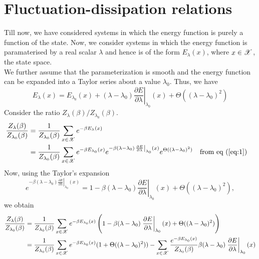\documentclass[letterpaper,english,12pt]{article}
\begin{document}
\section{Fluctuation-dissipation relations}
Till now, we have considered systems in which the energy function is purely a function of the state. Now, we consider systems in which the energy function is paramaterised by a real scalar $\lambda$ and hence is of the form $E_\lambda(x)$, where $x \in \mathscr{X}$, the state space.\\
We further assume that the parameterization is smooth and the energy function can be expanded into a Taylor series about a value $\lambda_0$. Thus, we have
\begin{equation}
E_\lambda(x) = E_{\lambda_0}(x) + (\lambda - \lambda_0)\left. \frac{\partial E}{\partial \lambda} \right|_{\lambda_0}(x) + \Theta((\lambda - \lambda_0)^2) \label{eq:1}
\end{equation}
Consider the ratio $Z_\lambda(\beta) / Z_{\lambda_0}(\beta)$.
\begin{align}
\frac{Z_\lambda(\beta)}{Z_{\lambda_0}(\beta)} &= \frac{1}{Z_{\lambda_0}(\beta)} \sum_{x \in \mathscr{X}} e^{-\beta E_{\lambda}(x)} \nonumber \\
	&= \frac{1}{Z_{\lambda_0}(\beta)} \sum_{x \in \mathscr{X}} e^{-\beta E_{\lambda_0}(x)} e^{-\beta (\lambda - \lambda_0)\left. \frac{\partial E}{\partial \lambda} \right|_{\lambda_0}(x)} e^{\Theta((\lambda - \lambda_0)^2)} && \text{from eq (\ref{eq:1})} \nonumber
\end{align}
Now, using the Taylor's expansion
\begin{equation}
e^{-\beta (\lambda - \lambda_0)\left. \frac{\partial E}{\partial \lambda} \right|_{\lambda_0}(x)} = 1 - \beta (\lambda - \lambda_0) \left. \frac{\partial E}{\partial \lambda} \right|_{\lambda_0}(x) + \Theta((\lambda - \lambda_0)^2), \label{eq:5}
\end{equation}
we obtain
\begin{align}
\frac{Z_\lambda(\beta)}{Z_{\lambda_0}(\beta)} &= \frac{1}{Z_{\lambda_0}(\beta)} \sum_{x \in \mathscr{X}} e^{-\beta E_{\lambda_0}(x)} \left( 1 - \beta (\lambda - \lambda_0) \left. \frac{\partial E}{\partial \lambda} \right|_{\lambda_0}(x) + \Theta((\lambda - \lambda_0)^2) \right) \nonumber \\
	&= \frac{1}{Z_{\lambda_0}(\beta)} \sum_{x \in \mathscr{X}} e^{-\beta E_{\lambda_0}(x)}(1 + \Theta((\lambda - \lambda_0)^2)) - \sum_{x \in \mathscr{X}} \frac{e^{- \beta E_{\lambda_0}(x)}}{Z_{\lambda_0}(\beta)} \beta (\lambda - \lambda_0) \left. \frac{\partial E}{\partial \lambda} \right|_{\lambda_0}(x) \label{eq:2}
\end{align}
\end{document}
